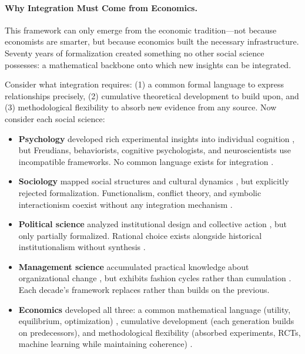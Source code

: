 \paragraph{Why Integration Must Come from Economics.}
This framework can only emerge from the economic tradition---not because economists are smarter, but because economics built the necessary infrastructure. Seventy years of formalization created something no other social science possesses: a mathematical backbone onto which new insights can be integrated.

Consider what integration requires: (1) a common formal language to express relationships precisely, (2) cumulative theoretical development to build upon, and (3) methodological flexibility to absorb new evidence from any source. Now consider each social science:
\begin{itemize}
    \item \textbf{Psychology} developed rich experimental insights into individual cognition \citep{kahneman2011,stanovich2011rationality}, but Freudians, behaviorists, cognitive psychologists, and neuroscientists use incompatible frameworks. No common language exists for integration \citep{mischel2008toothbrush}.
    \item \textbf{Sociology} mapped social structures and cultural dynamics \citep{merton1968social,giddens1984constitution}, but explicitly rejected formalization. Functionalism, conflict theory, and symbolic interactionism coexist without any integration mechanism \citep{collins1994four}.
    \item \textbf{Political science} analyzed institutional design and collective action \citep{ostrom1990,olson1965logic}, but only partially formalized. Rational choice exists alongside historical institutionalism without synthesis \citep{hall1996political}.
    \item \textbf{Management science} accumulated practical knowledge about organizational change \citep{lewin1947frontiers,kotter1996leading}, but exhibits fashion cycles rather than cumulation \citep{abrahamson1996management}. Each decade's framework replaces rather than builds on the previous.
    \item \textbf{Economics} developed all three: a common mathematical language (utility, equilibrium, optimization) \citep{mascolell1995microeconomic}, cumulative development (each generation builds on predecessors), and methodological flexibility (absorbed experiments, RCTs, machine learning while maintaining coherence) \citep{angrist2009mostly}.
\end{itemize}

